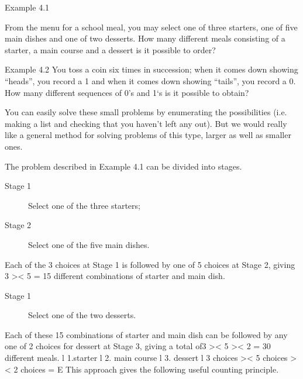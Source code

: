 \documentclass{beamer}
\begin{document}
\begin{frame}

\end{frame}
\begin{frame}
Example 4.1 

From the menu for a school meal, you may select one of
three starters, one of ﬁve main dishes and one of two desserts. How
many different meals consisting of a starter, a main course and a
dessert is it possible to order?

Example 4.2 You toss a coin six times in succession; when it comes
down showing “heads”, you record a 1 and when it comes down
showing “tails”, you record a 0. How many different sequences of 0’s
and 1‘s is it possible to obtain?

\end{frame}
\begin{frame}
You can easily solve these small problems by enumerating the
possibilities (i.e. making a list and checking that you haven't left any
out). But we would really like a general method for solving
problems of this type, larger as well as smaller ones.
\end{frame}
\begin{frame}
The problem described in Example 4.1 can be divided into stages.
\begin{description}
\item[Stage 1] Select one of the three starters;
\item[Stage 2] Select one of the ﬁve main dishes.
\end{description}
Each of the 3 choices at Stage 1 is followed by one of 5 choices
at Stage 2, giving 3 >< 5 = 15 different combinations of starter
and main dish.
\end{frame}
\begin{frame}
\begin{description}
\item[Stage 1] Select one of the two desserts.
\end{description}
Each of these 15 combinations of starter and main dish can be
followed by any one of 2 choices for dessert at Stage 3, giving a
total of3 >< 5 >< 2 = 30 different meals.
l 1.starter l 2. main course l 3. dessert l
3 choices >< 5 choices >< 2 choices = E
This approach gives the following useful counting principle.
\end{frame}
\end{document}
